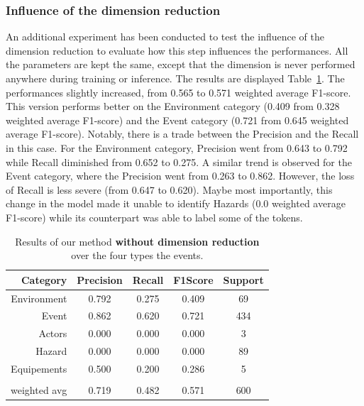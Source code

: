 
\subsubsection{Influence of the dimension reduction}
An additional experiment has been conducted to test the influence of the dimension reduction to evaluate how this step influences the performances.
All the parameters are kept the same, except that the dimension is never performed anywhere during training or inference.
The results are displayed Table~\ref{table:overall-results-nodim}.
The performances slightly increased, from 0.565 to 0.571 weighted average F1-score.
This version performs better on the Environment category (0.409 from 0.328 weighted average F1-score) and the Event category (0.721 from 0.645 weighted average F1-score).
Notably, there is a trade between the Precision and the Recall in this case.
For the Environment category, Precision went from 0.643 to 0.792 while Recall diminished from 0.652 to 0.275.
A similar trend is observed for the Event category, where the Precision went from 0.263 to 0.862.
However, the loss of Recall is less severe (from 0.647 to 0.620).
Maybe most importantly, this change in the model made it unable to identify Hazards (0.0 weighted average F1-score) while its counterpart was able to label some of the tokens.

\begin{table}[bht]
    \centering
    \caption{Results of our method \textbf{without dimension reduction} over the four types the events.}
    \begin{tabular}{rcccc}
        Category     & Precision & Recall & F1\-Score & Support \\
        \toprule
        Environment  & 0.792     & 0.275  & 0.409     & 69      \\
        Event        & 0.862     & 0.620  & 0.721     & 434     \\
        Actors       & 0.000     & 0.000  & 0.000     & 3       \\
        Hazard       & 0.000     & 0.000  & 0.000     & 89      \\
        Equipements  & 0.500     & 0.200  & 0.286     & 5       \\
                     &           &        &           &         \\
        weighted avg & 0.719     & 0.482  & 0.571     & 600     \\
        \bottomrule
    \end{tabular}
    \label{table:overall-results-nodim}
\end{table}

